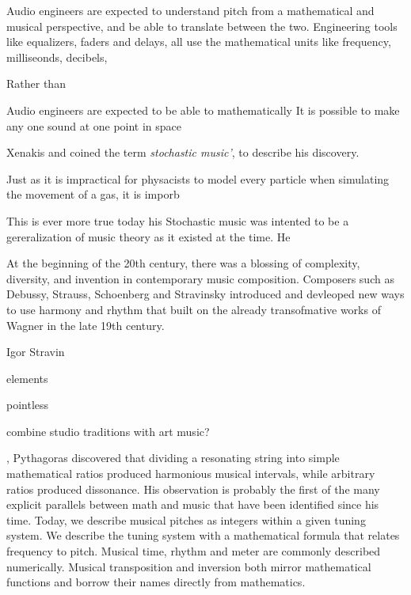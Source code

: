 Audio engineers are expected to understand pitch from a mathematical
and musical perspective, and be able to translate between the two.
Engineering tools like equalizers, faders and delays, all use the
mathematical units like frequency, milliseonds, decibels, 

Rather than 


Audio engineers are expected to be able to mathematically 
It is possible to make any one sound at one point in space


Xenakis 
and coined the term \textit{stochastic music'}, to describe his discovery.








 Just as it is impractical for physacists to model every particle
 when simulating the movement of a gas, it is imporb

This is ever more true today 
 his Stochastic music was intented to be a
gereralization of music theory as it existed at the time. He


At the beginning of the 20th century, there was a blossing of
complexity, diversity, and invention in contemporary music
composition. Composers such as Debussy, Strauss, Schoenberg and
Stravinsky introduced and devleoped new ways to use harmony and rhythm
that built on the already transofmative works of Wagner in the late
19th century.



Igor Stravin



elements

pointless 

combine studio traditions with art music?

, Pythagoras discovered that
dividing a resonating string into simple mathematical ratios produced
harmonious musical intervals, while arbitrary ratios produced
dissonance.  His observation is probably the first of the many
explicit parallels between math and music that have been identified
since his time. Today, we describe musical pitches as integers within
a given tuning system. We describe the tuning system with a
mathematical formula that relates frequency to pitch. Musical time,
rhythm and meter are commonly described numerically. Musical
transposition and inversion both mirror mathematical functions and
borrow their names directly from mathematics.


